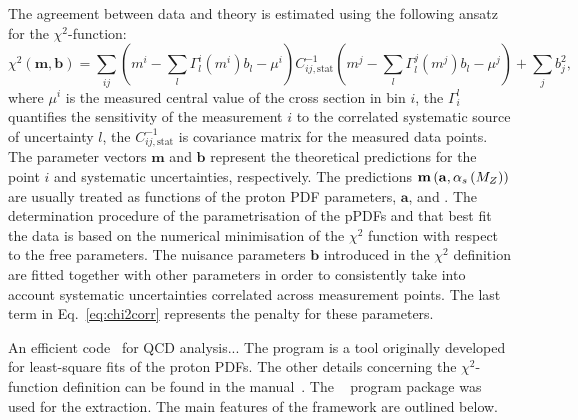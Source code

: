 The agreement between data and theory is estimated using the following ansatz for the $\chi^2$-function:
\begin{equation}
 \chi^2\left( \mathbf{m},\mathbf{b}\right) = \sum_{ij}{\left( m^i -\sum_{l}{\Gamma_l^i\left( m^i\right)b_l - \mu^i }\right) C^{-1}_{ij,\text{stat}} \left( m^j -\sum_{l}{\Gamma_l^j\left( m^j\right)b_l - \mu^j }\right) } + \sum_{j}{b_j^2},
 \label{eq:chi2corr}
\end{equation}
where $\mu^i$ is the measured central value of the cross section in bin $i$, the $\Gamma_i^l$ quantifies the sensitivity of the measurement $i$ to the correlated systematic source of uncertainty $l$, the $C^{-1}_{ij,\text{stat}}$ is covariance matrix for the measured data points. The parameter vectors $\mathbf{m}$ and $\mathbf{b}$ represent the theoretical predictions for the point $i$ and systematic uncertainties, respectively. The predictions $\mathbf{m}\left( \mathbf{a},\mbox{$\alpha_{s}\left(M_{Z}\right)$}\right)$ are usually treated as functions of the proton PDF parameters, $\mathbf{a}$,  and \asz. The determination procedure of the parametrisation of the pPDFs and \as that best fit the data is based on the numerical minimisation of the $\chi^2$ function with respect to the free parameters. The nuisance parameters $\mathbf{b}$ introduced in the $\chi^2$ definition are fitted together with other parameters in order to consistently take into account systematic uncertainties correlated across measurement points. The last term in Eq.~\eqref{eq:chi2corr} represents the penalty for these parameters.

An efficient code~\cite{herafitter} for QCD analysis...  The \herafitter program is a tool originally developed for least-square fits of the proton PDFs. The other details concerning the $\chi^2$-function definition can be found in the \herafitter manual~\cite{herafitter:2014:manual}. The \herafitter~\cite{Aaron:2009aa,Aaron:2009kv} program package was used for the \as extraction. The main features of the \herafitter framework are outlined below.

